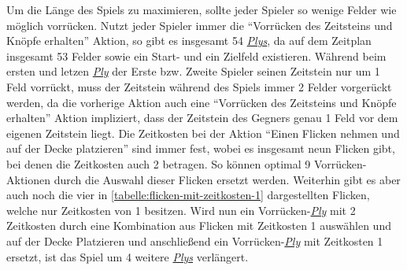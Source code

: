 Um die Länge des Spiels zu maximieren, sollte jeder Spieler so wenige Felder wie möglich vorrücken. Nutzt jeder Spieler immer die \enquote{Vorrücken des Zeitsteins und Knöpfe erhalten} Aktion, so gibt es insgesamt 54 \hyperref[text:ply]{\emph{Plys}}, da auf dem Zeitplan insgesamt 53 Felder sowie ein Start- und ein Zielfeld existieren. Während beim ersten und letzen \hyperref[text:ply]{\emph{Ply}} der Erste bzw. Zweite Spieler seinen Zeitstein nur um 1 Feld vorrückt, muss der Zeitstein während des Spiels immer 2 Felder vorgerückt werden, da die vorherige Aktion \textemdash{} auch eine \enquote{Vorrücken des Zeitsteins und Knöpfe erhalten} Aktion \textemdash{} impliziert, dass der Zeitstein des Gegners genau 1 Feld vor dem eigenen Zeitstein liegt. Die Zeitkosten bei der Aktion \enquote{Einen Flicken nehmen und auf der Decke platzieren} sind immer fest, wobei es insgesamt neun Flicken gibt, bei denen die Zeitkosten auch 2 betragen. So können optimal 9 Vorrücken-Aktionen durch die Auswahl dieser Flicken ersetzt werden. Weiterhin gibt es aber auch noch die vier in \ref{tabelle:flicken-mit-zeitkosten-1} dargestellten Flicken, welche nur Zeitkosten von 1 besitzen. Wird nun ein Vorrücken-\hyperref[text:ply]{\emph{Ply}} mit 2 Zeitkosten durch eine Kombination aus Flicken mit Zeitkosten 1 auswählen und auf der Decke Platzieren und anschließend ein Vorrücken-\hyperref[text:ply]{\emph{Ply}} mit Zeitkosten 1 ersetzt, ist das Spiel um 4 weitere \hyperref[text:ply]{\emph{Plys}} verlängert.

